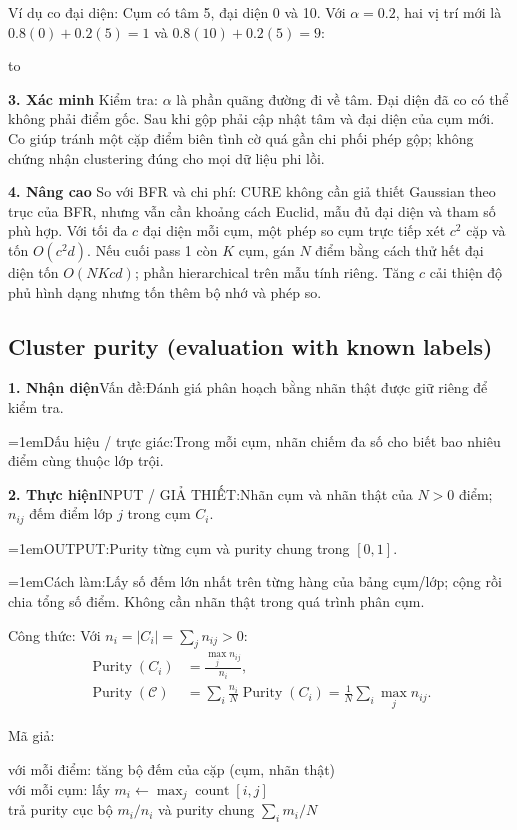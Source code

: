 \documentclass[10pt,a4paper,twocolumn]{article}
\makeatletter
\newif\ifexamheadingprinted
\newcommand{\topic}[2]{%
  \global\examheadingprintedfalse\par\subsection{#2}\label{topic:#1}}
\newcommand{\key}[1]{#1:\enspace}
\newenvironment{diagram}{%
  \par\addvspace{3pt}\noindent\hbox to \linewidth\bgroup\hfil
}{\hfil\egroup\par\addvspace{3pt}}
\newcommand{\algfield}[2]{\par\noindent\hangindent=1em\relax#1:\enspace#2}
\newcommand{\unitheading}[2]{%
  \par\addvspace{1pt}\noindent\textbf{#1. #2}\enspace}
\newcommand{\unitverification}{\unitheading{3}{Xác minh}}
\newcommand{\unitadvanced}{\unitheading{4}{Nâng cao}}
\newcommand{\unitfield}[4]{%
  \par\noindent\textbf{#1. #2}\enspace #3:\enspace #4}
\newcommand{\algsummary}[6]{%
  \begingroup\setlength{\parskip}{1pt}%
  \unitfield{1}{Nhận diện}{Vấn đề}{#1}%
  \algfield{Dấu hiệu / trực giác}{#2}%
  \if\relax\detokenize{#3}\relax\else\par\noindent#3\par\fi%
  \unitfield{2}{Thực hiện}{INPUT / GIẢ THIẾT}{#4}%
  \algfield{OUTPUT}{#5}%
  \algfield{Cách làm}{#6}\par\endgroup}
\newenvironment{algpseudo}{%
  \par\addvspace{2pt}\noindent
  \setlength{\parskip}{0pt}%
  Mã giả:\par\nobreak
  \begin{list}{}{\setlength{\leftmargin}{1em}\setlength{\topsep}{0pt}%
    \setlength{\partopsep}{0pt}\setlength{\parsep}{0pt}%
    \@beginparpenalty=10000\relax}%
  \item\relax
}{\end{list}\par\addvspace{3pt}}
\makeatother
\begin{document}
\key{Ví dụ co đại diện} Cụm có tâm 5, đại diện 0 và 10. Với $\alpha=0.2$, hai vị trí mới là $0.8(0)+0.2(5)=1$ và $0.8(10)+0.2(5)=9$:
\begin{diagram}
\end{diagram}

\unitverification
\key{Kiểm tra} $\alpha$ là phần quãng đường đi về tâm. Đại diện đã co có thể không phải điểm gốc. Sau khi gộp phải cập nhật tâm và đại diện của cụm mới. Co giúp tránh một cặp điểm biên tình cờ quá gần chi phối phép gộp; không chứng nhận clustering đúng cho mọi dữ liệu phi lồi.

\unitadvanced
\key{So với BFR và chi phí} CURE không cần giả thiết Gaussian theo trục của BFR, nhưng vẫn cần khoảng cách Euclid, mẫu đủ đại diện và tham số phù hợp. Với tối đa $c$ đại diện mỗi cụm, một phép so cụm trực tiếp xét $c^2$ cặp và tốn $O(c^2d)$. Nếu cuối pass 1 còn $K$ cụm, gán $N$ điểm bằng cách thử hết đại diện tốn $O(NKcd)$; phần hierarchical trên mẫu tính riêng. Tăng $c$ cải thiện độ phủ hình dạng nhưng tốn thêm bộ nhớ và phép so.
\topic{purity}{Cluster purity (evaluation with known labels)}

\algsummary{Đánh giá phân hoạch bằng nhãn thật được giữ riêng để kiểm tra.}{Trong mỗi cụm, nhãn chiếm đa số cho biết bao nhiêu điểm cùng thuộc lớp trội.}{}{Nhãn cụm và nhãn thật của $N>0$ điểm; $n_{ij}$ đếm điểm lớp $j$ trong cụm $C_i$.}{Purity từng cụm và purity chung trong $[0,1]$.}{Lấy số đếm lớn nhất trên từng hàng của bảng cụm/lớp; cộng rồi chia tổng số điểm. Không cần nhãn thật trong quá trình phân cụm.}

\key{Công thức} Với $n_i=|C_i|=\sum_j n_{ij}>0$:
\begin{align*}
\operatorname{Purity}(C_i)&=\frac{\max_j n_{ij}}{n_i},\\
\operatorname{Purity}(\mathcal C)
&=\sum_i\frac{n_i}{N}\operatorname{Purity}(C_i)
=\frac1N\sum_i\max_j n_{ij}.
\end{align*}

\begin{algpseudo}
với mỗi điểm: tăng bộ đếm của cặp (cụm, nhãn thật)\\
với mỗi cụm: lấy $m_i\gets\max_j\operatorname{count}[i,j]$\\
trả purity cục bộ $m_i/n_i$ và purity chung $\sum_i m_i/N$
\end{algpseudo}
\end{document}
